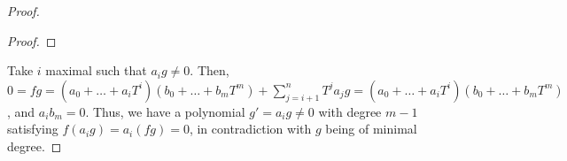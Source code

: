 \begin{problem}
\begin{enumerate}[label=(\theproblem.\arabic*),ref=\theproblem.\arabic*]
\begin{sol}
\begin{proof}
\begin{claim}
\begin{proof}
                        \end{proof}
                    \end{claim}
                    Take $i$ maximal such that $a_i g \neq 0$.
                    Then, $0 = f g = (a_0 + \dots + a_i T^i) (b_0 + \dots + b_m T^m) + \sum_{j=i+1}^n T^j a_j g = (a_0 + \dots + a_i T^i) (b_0 + \dots + b_m T^m)$, and $a_i b_m = 0$.
                    Thus, we have a polynomial $g' = a_i g \neq 0$ with degree $m-1$ satisfying $f (a_i g) = a_i (f g) = 0$, in contradiction with $g$ being of minimal degree.
                \end{proof}
            \end{sol}
    \end{enumerate}
\end{problem}
